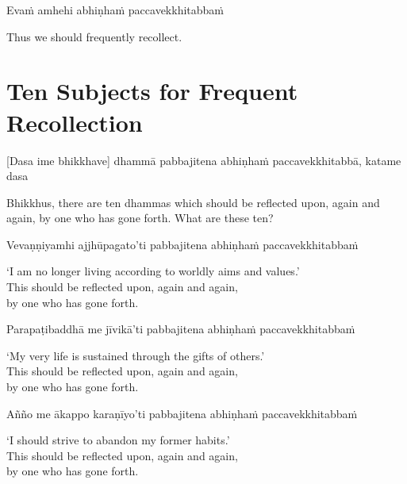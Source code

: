 Evaṁ amhehi abhiṇhaṁ paccavekkhitabbaṁ

\begin{english}
  Thus we should frequently recollect.
\end{english}

\section{Ten Subjects for Frequent Recollection}


\begin{leader}
\end{leader}

[Dasa ime bhikkhave] dhammā pabbajitena abhiṇhaṁ paccavekkhitabbā, katame dasa

\begin{english}
  Bhikkhus, there are ten dhammas which should be reflected upon, again and again, by one who has gone forth. What are these ten?
\end{english}

Vevaṇṇiyamhi ajjhūpagato'ti pabbajitena abhiṇhaṁ paccavekkhitabbaṁ

\begin{english}
  `I am no longer living according to worldly aims and values.'\\
  This should be reflected upon, again and again,\\
  by one who has gone forth.
\end{english}

Parapaṭibaddhā me jīvikā'ti pabbajitena abhiṇhaṁ paccavekkhitabbaṁ

\begin{english}
  `My very life is sustained through the gifts of others.'\\
  This should be reflected upon, again and again,\\
  by one who has gone forth.
\end{english}

Añño me ākappo karaṇīyo'ti pabbajitena abhiṇhaṁ paccavekkhitabbaṁ

\begin{english}
  `I should strive to abandon my former habits.'\\
  This should be reflected upon, again and again,\\
  by one who has gone forth.
\end{english}

